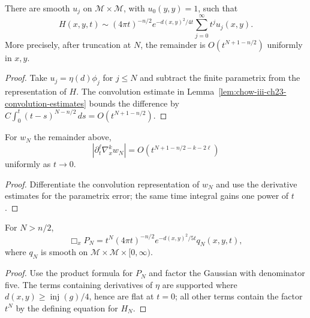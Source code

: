 \begin{theorem}
\label{thm:chow-iii-ch23-heat-kernel-expansion}


There are smooth $u_j$ on $\mathcal M\times\mathcal M$, with $u_0(y,y)=1$, such that
\[
H(x,y,t)\sim(4\pi t)^{-n/2}e^{-d(x,y)^2/4t}\sum_{j=0}^{\infty}t^ju_j(x,y).
\]
More precisely, after truncation at $N$, the remainder is
\(O(t^{N+1-n/2})\) uniformly in $x,y$.
\end{theorem}
\begin{proof}
\sketch Take $u_j=\eta(d)\phi_j$ for $j\le N$ and subtract the finite parametrix
from the representation of $H$.  The convolution estimate in
Lemma~\ref{lem:chow-iii-ch23-convolution-estimates} bounds the difference by
\(C\int_0^t(t-s)^{N-n/2}\,ds=O(t^{N+1-n/2})\).
\end{proof}

\begin{example}
\label{ex:chow-iii-ch23-expansion-derivatives}

For $w_N$ the remainder above,
\[
|\partial_t^\ell\nabla_x^kw_N|=O(t^{N+1-n/2-k-2\ell})
\]
uniformly as $t\to0$.
\end{example}
\begin{proof}
\sketch Differentiate the convolution representation of $w_N$ and use the derivative
estimates for the parametrix error; the same time integral gains one power of
$t$.
\end{proof}

\begin{lemma}
\label{lem:chow-iii-ch23-coefficient-structure}

For $N>n/2$,
\[
\Box_xP_N=t^N(4\pi t)^{-n/2}e^{-d(x,y)^2/5t}q_N(x,y,t),
\]
where $q_N$ is smooth on $\mathcal M\times\mathcal M\times[0,\infty)$.
\end{lemma}
\begin{proof}
\sketch Use the product formula for $P_N$ and factor the Gaussian with denominator five.
The terms containing derivatives of $\eta$ are supported where
$d(x,y)\ge\operatorname{inj}(g)/4$, hence are flat at $t=0$; all other terms
contain the factor $t^N$ by the defining equation for $H_N$.
\end{proof}

